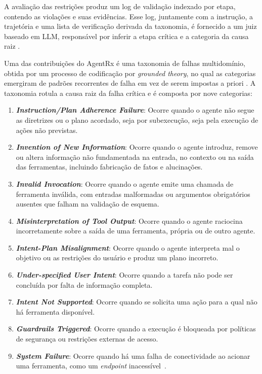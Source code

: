 \documentclass[sigconf]{acmart}
\begin{document}
A avaliação das restrições produz um log de validação indexado por etapa, contendo as violações e suas evidências. Esse
log, juntamente com a instrução, a trajetória e uma lista de verificação derivada da taxonomia, é fornecido a um juiz
baseado em LLM, responsável por inferir a etapa crítica e a categoria da causa raiz \cite{barke2026agentrx}.

Uma das contribuições do AgentRx é uma taxonomia de falhas multidomínio, obtida por um processo de codificação por
\textit{grounded theory}, no qual as categorias emergiram de padrões recorrentes de falha em vez de serem impostas a
priori \cite{barke2026agentrx}. A taxonomia rotula a causa raiz da falha crítica e é composta por nove categorias:

\begin{enumerate}
	\item \textbf{\textit{Instruction/Plan Adherence Failure}}: Ocorre quando o agente não segue as diretrizes ou o plano acordado,
	      seja por subexecução, seja pela execução de ações não previstas.

	\item \textbf{\textit{Invention of New Information}}: Ocorre quando o agente introduz, remove ou altera informação não fundamentada
	      na entrada, no contexto ou na saída das ferramentas, incluindo fabricação de fatos e alucinações.

	\item \textbf{\textit{Invalid Invocation}}: Ocorre quando o agente emite uma chamada de ferramenta inválida, com entradas malformadas
	      ou argumentos obrigatórios ausentes que falham na validação de esquema.

	\item \textbf{\textit{Misinterpretation of Tool Output}}: Ocorre quando o agente raciocina incorretamente sobre a saída de uma
	      ferramenta, própria ou de outro agente.

	\item \textbf{\textit{Intent-Plan Misalignment}}: Ocorre quando o agente interpreta mal o objetivo ou as restrições do usuário
	      e produz um plano incorreto.

	\item \textbf{\textit{Under-specified User Intent}}: Ocorre quando a tarefa não pode ser concluída por falta de informação completa.

	\item \textbf{\textit{Intent Not Supported}}: Ocorre quando se solicita uma ação para a qual não há ferramenta disponível.

	\item \textbf{\textit{Guardrails Triggered}}: Ocorre quando a execução é bloqueada por políticas de segurança ou restrições externas de acesso.

	\item \textbf{\textit{System Failure}}: Ocorre quando há uma falha de conectividade ao acionar uma ferramenta, como um \textit{endpoint} inacessível~\cite{barke2026agentrx}.
\end{enumerate}
\end{document}
